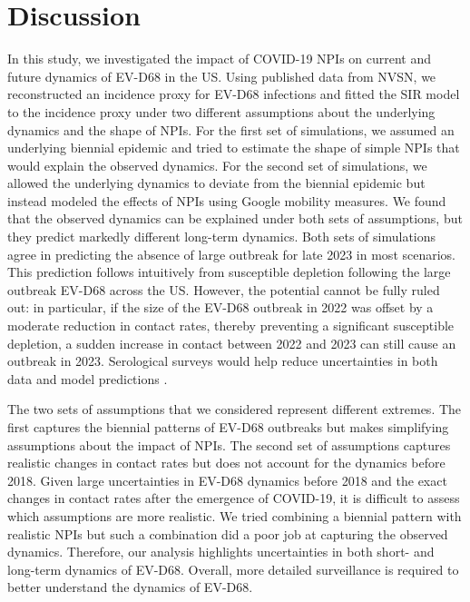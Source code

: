 \documentclass[12pt]{article}
\begin{document}
\section{Discussion}

In this study, we investigated the impact of COVID-19 NPIs on current and future dynamics of EV-D68 in the US.
Using published data from NVSN, we reconstructed an incidence proxy for EV-D68 infections and fitted the SIR model to the incidence proxy under two different assumptions about the underlying dynamics and the shape of NPIs.
For the first set of simulations, we assumed an underlying biennial epidemic and tried to estimate the shape of simple NPIs that would explain the observed dynamics.
For the second set of simulations, we allowed the underlying dynamics to deviate from the biennial epidemic but instead modeled the effects of NPIs using Google mobility measures.
We found that the observed dynamics can be explained under both sets of assumptions, but they predict markedly different long-term dynamics.
Both sets of simulations agree in predicting the absence of large outbreak for late 2023 in most scenarios.
This prediction follows intuitively from susceptible depletion following the large outbreak EV-D68 across the US.
However, the potential cannot be fully ruled out:
in particular, if the size of the EV-D68 outbreak in 2022 was offset by a moderate reduction in contact rates, thereby preventing a significant susceptible depletion, a sudden increase in contact between 2022 and 2023 can still cause an outbreak in 2023.
Serological surveys would help reduce uncertainties in both data and model predictions \citep{nguyen2022enterovirus}.

The two sets of assumptions that we considered represent different extremes.
The first captures the biennial patterns of EV-D68 outbreaks but makes simplifying assumptions about the impact of NPIs.
The second set of assumptions captures realistic changes in contact rates but does not account for the dynamics before 2018.
Given large uncertainties in EV-D68 dynamics before 2018 and the exact changes in contact rates after the emergence of COVID-19, it is difficult to assess which assumptions are more realistic.
We tried combining a biennial pattern with realistic NPIs but such a combination did a poor job at capturing the observed dynamics.
Therefore, our analysis highlights uncertainties in both short- and long-term dynamics of EV-D68.
Overall, more detailed surveillance is required to better understand the dynamics of EV-D68.
\end{document}
